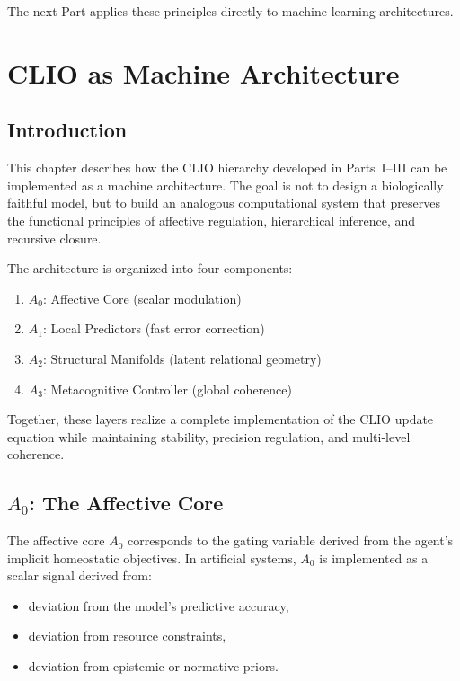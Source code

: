 \documentclass[12pt,oneside]{book}
\theoremstyle{plain}
\theoremstyle{definition}
\begin{document}
The next Part applies these principles directly to machine learning
architectures.

\chapter{CLIO as Machine Architecture}

\section{Introduction}

This chapter describes how the CLIO hierarchy developed in Parts~I--III can be
implemented as a machine architecture.
The goal is not to design a biologically faithful model, but to build an
analogous computational system that preserves the functional principles of
affective regulation, hierarchical inference, and recursive closure.

The architecture is organized into four components:

\begin{enumerate}
    \item $A_0$: Affective Core (scalar modulation)
    \item $A_1$: Local Predictors (fast error correction)
    \item $A_2$: Structural Manifolds (latent relational geometry)
    \item $A_3$: Metacognitive Controller (global coherence)
\end{enumerate}

Together, these layers realize a complete implementation of the CLIO update
equation while maintaining stability, precision regulation, and multi-level
coherence.

\section{$A_0$: The Affective Core}

The affective core $A_0$ corresponds to the gating variable derived from the
agent’s implicit homeostatic objectives.
In artificial systems, $A_0$ is implemented as a scalar signal derived from:

\begin{itemize}
    \item deviation from the model’s predictive accuracy,
    \item deviation from resource constraints,
    \item deviation from epistemic or normative priors.
\end{itemize}
\end{document}
